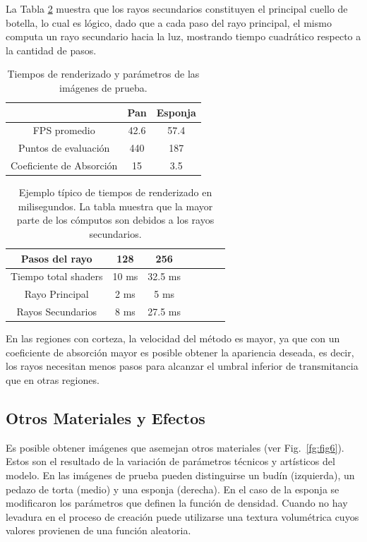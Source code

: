 La Tabla \ref{tab:rayossecundarios} muestra que los rayos secundarios constituyen el principal cuello de botella, lo cual es lógico, dado que a cada paso del rayo principal, el mismo computa un rayo secundario hacia la luz, mostrando tiempo cuadrático respecto a la cantidad de pasos.


\begin{table}[htb]
\centering
\begin{tabular}{|c|c|c|}
\hline &  Pan & Esponja \\
\hline
\hline
 FPS promedio & 42.6 & 57.4\\
\hline
 Puntos de evaluación &  440  & 187 \\
\hline
 Coeficiente de Absorción &  15  & 3.5 \\
\hline
\end{tabular}
\caption{Tiempos de renderizado y parámetros de las imágenes de prueba.}
\label{tab:tiemposrenderizado}
\end{table}

\begin{table}[htb]
\centering
\begin{tabular}{|c|c|c|c|c|c|c|}
\hline
 Pasos del rayo         & 128 &  256 \\
\hline
\hline
 Tiempo total shaders   & 10 ms &  32.5 ms \\
\hline
 Rayo Principal         & 2 ms  & 5 ms  \\
\hline
 Rayos Secundarios      &  8 ms & 27.5 ms  \\
\hline
\end{tabular}
\caption[Tiempos de renderizado en milisegundos]{Ejemplo típico de tiempos de renderizado en milisegundos. La tabla muestra que la mayor parte de los cómputos son debidos a los rayos secundarios.}
\label{tab:rayossecundarios}
\end{table}


En las regiones con corteza, la velocidad del método es mayor, ya que con un coeficiente de absorción mayor es posible obtener la apariencia deseada, es decir, los rayos necesitan menos pasos para alcanzar el umbral inferior de transmitancia que en otras regiones.

\subsection{Otros Materiales y Efectos}
Es posible obtener imágenes que asemejan otros materiales (ver Fig.~\ref{fg:fig6}).
Estos son el resultado de la variación de parámetros técnicos y artísticos del modelo.
En las imágenes de prueba pueden distinguirse un budín (izquierda), un pedazo de torta (medio) y una esponja (derecha).
En el caso de la esponja se modificaron los parámetros que definen la función de densidad.
Cuando no hay levadura en el proceso de creación puede utilizarse una textura volumétrica cuyos valores provienen de una función aleatoria.

